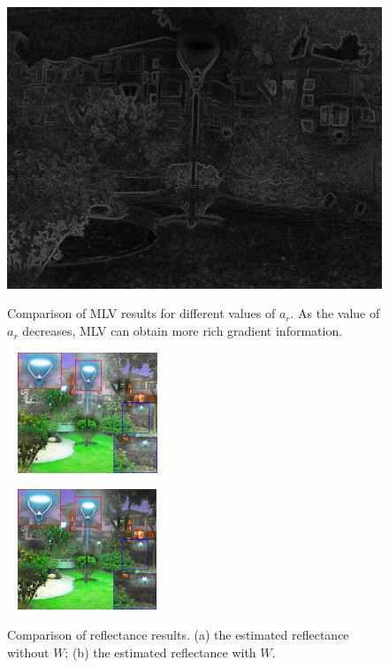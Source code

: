 \begin{figure}[t]
\begin{minipage}[b]{0.32\hsize}
\includegraphics[height=0.75\hsize]{images/noise/MLV_05.eps}
 \label{fig:mlv_pow}
\end{minipage}
\caption{Comparison of MLV results for different values of $a_{r}$. As the value of $a_{r}$ decreases, MLV can obtain more rich gradient information.}
\label{fig:mlv_change}
\end{figure}

\begin{figure}[t]
\centering
\begin{minipage}[b]{0.49\hsize}
\centering
\includegraphics[width = 48mm, height=36mm]{images/noise/mlv_wo.eps}
 \label{fig: wo}
\end{minipage}
\begin{minipage}[b]{0.49\hsize}
\centering
\includegraphics[width = 48mm, height=36mm]{images/noise/mlv_reflectance.eps}
 \label{fig: w}
\end{minipage}
\caption{Comparison of reflectance results. (a) the estimated reflectance without $W$; (b) the estimated reflectance with $W$.}
\label{fig: noise_suppression}
\end{figure}

